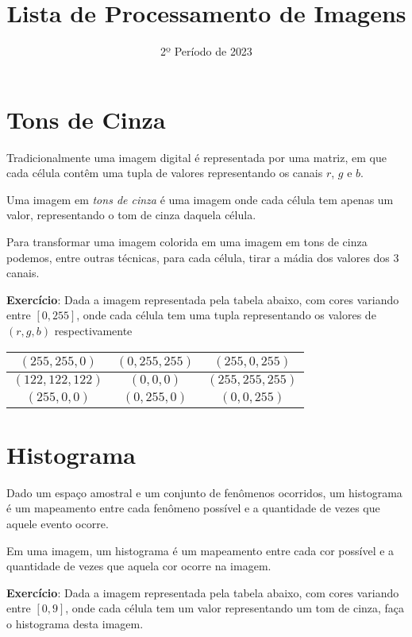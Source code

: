 \documentclass[12pt]{article}
\title{Lista de Processamento de Imagens}
\date{2º Período de 2023}
\begin{document}
\maketitle


\vspace{3em}

\section{Tons de Cinza}

Tradicionalmente uma imagem digital é representada por uma matriz, em que cada célula contêm uma tupla de valores representando os canais $r$, $g$ e $b$.

Uma imagem em \textit{tons de cinza} é uma imagem onde cada célula tem apenas um valor, representando o tom de cinza daquela célula.

Para transformar uma imagem colorida em uma imagem em tons de cinza podemos, entre outras técnicas, para cada célula, tirar a mádia dos valores dos 3 canais.


\textbf{Exercício}: Dada a imagem representada pela tabela abaixo, com cores variando entre $[0, 255]$, onde cada célula tem uma tupla representando os valores de $(r, g, b)$ respectivamente

\begin{tabular}{|c|c|c|}
\hline
$(255, 255,   0)$ & $(  0, 255, 255)$ & $(255,   0, 255)$ \\ \hline
$(122, 122, 122)$ & $(  0,   0,   0)$ & $(255, 255, 255)$ \\ \hline
$(255,   0,   0)$ & $(  0, 255,   0)$ & $(  0,   0, 255)$ \\ \hline

\end{tabular}



\break



\section{Histograma}

Dado um espaço amostral e um conjunto de fenômenos ocorridos, um histograma é um mapeamento entre cada fenômeno possível e a quantidade de vezes que aquele evento ocorre.

Em uma imagem, um histograma é um mapeamento entre cada cor possível e a quantidade de vezes que aquela cor ocorre na imagem.

\textbf{Exercício}: Dada a imagem representada pela tabela abaixo, com cores variando entre $[0, 9]$, onde cada célula tem um valor representando um tom de cinza, faça o histograma desta imagem.
\end{document}
